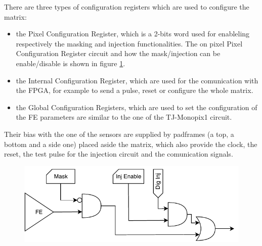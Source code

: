         There are three types of configuration registers which are used to configure the matrix: 
        \begin{itemize}
            \item the Pixel Configuration Register, which is a 2-bits word used for enableling respectively the masking and injection functionalities. %
            The on pixel Pixel Configuration Register circuit and how the mask/injection can be enable/disable is shown in figure \ref{fig:pixel_cfg}.
            \item the Internal Configuration Register, which are used for the comunication with the FPGA, for example to send a pulse, reset or configure the whole matrix.
            \item the Global Configuration Registers, which are used to set the configuration of the FE parameters are similar to the one of the TJ-Monopix1 circuit.
        \end{itemize}
        Their bias with the one of the sensors are supplied by padframes (a top, a bottom and a side one) placed aside the matrix, which also provide the clock, the reset, the test pulse for the injection circuit and the comunication signals.
        \begin{figure}[h!]
            \centering
            \includegraphics[width=.7\linewidth]{figures/ARCADIA/pixel_cfg.pdf}
            \caption{}
            \label{fig:pixel_cfg}
        \end{figure}    
